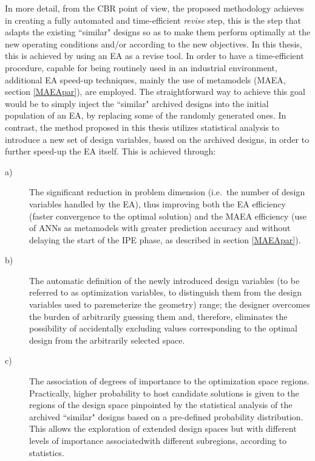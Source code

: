 In more detail, from the CBR point of view, the proposed methodology achieves in creating a fully automated and time-efficient \textit{revise} step, this is the step that adapts the existing ``similar" designs so as to make them perform optimally at the new operating conditions and/or according to the new objectives. In this thesis, this is achieved by using an EA as a revise tool. In order to have a time-efficient procedure, capable for being routinely used in an industrial environment, additional EA speed-up techniques, mainly the use of metamodels (MAEA, section \ref{MAEApar}), are employed. The straightforward way to achieve this goal would be to simply inject the ``similar" archived designs into the initial population of an EA, by replacing some of the randomly generated ones.
In contrast, the method proposed in this thesis utilizes statistical analysis to introduce a new set of design variables, based on the archived designs, in order to further speed-up the EA itself. This is achieved through:  
\begin{description}
  \item[a)]The significant reduction in problem dimension (i.e.\ the number of design variables handled by the EA), thus improving both the EA efficiency (faster convergence to the optimal solution) and the MAEA efficiency (use of ANNs as metamodels  with greater prediction accuracy and without delaying the start of the IPE phase, as described in section \ref{MAEApar}). 
  \item[b)]The automatic definition of the newly introduced design variables (to be referred to as optimization variables, to distinguish them from the design variables used to paremeterize the geometry) range; the designer overcomes the burden of arbitrarily guessing them and, therefore, eliminates the possibility of accidentally excluding values corresponding to the optimal design from the arbitrarily selected space. 
    \item[c)]The association of degrees of importance to the optimization space regions. Practically, higher probability to host candidate solutions is given to the regions of the design space pinpointed by the statistical analysis of the archived ``similar" designs based on a pre-defined probability distribution. This allows the exploration of extended design spaces but with different levels of importance associatedwith different subregions, according to statistics.
\end{description}

